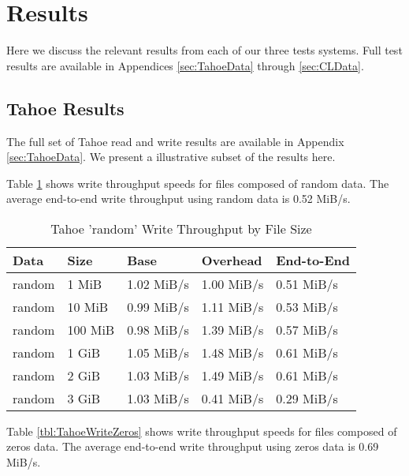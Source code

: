 \documentclass[11pt]{article}
\begin{document}
\section{Results}

Here we discuss the relevant results from each of our three tests
systems. Full test results are available in Appendices
\ref{sec:TahoeData} through \ref{sec:CLData}.

\subsection{Tahoe Results}

The full set of Tahoe read and write results are available in Appendix
\ref{sec:TahoeData}. We present a illustrative subset of the results
here.

Table \ref{tbl:TahoeWriteRandom} shows write throughput speeds for files
composed of random data. The average end-to-end write throughput using
random data is 0.52 MiB/s.

\begin{table}
  \begin{center}
    \begin{tabularx}{\textwidth}{|X|X|X|X|X|}
      \hline
      {\bf Data} & {\bf Size} & {\bf Base} & {\bf Overhead} & {\bf End-to-End} \\ \hline
      random & 1 MiB & 1.02 MiB/s & 1.00 MiB/s & 0.51 MiB/s \\ \hline
      random & 10 MiB & 0.99 MiB/s & 1.11 MiB/s & 0.53 MiB/s \\ \hline
      random & 100 MiB & 0.98 MiB/s & 1.39 MiB/s & 0.57 MiB/s \\ \hline
      random & 1 GiB & 1.05 MiB/s & 1.48 MiB/s & 0.61 MiB/s \\ \hline
      random & 2 GiB & 1.03 MiB/s & 1.49 MiB/s & 0.61 MiB/s \\ \hline
      random & 3 GiB & 1.03 MiB/s & 0.41 MiB/s & 0.29 MiB/s \\ \hline
    \end{tabularx}
    \caption{Tahoe 'random' Write Throughput by File Size}
    \label{tbl:TahoeWriteRandom}
  \end{center}
\end{table}

Table \ref{tbl:TahoeWriteZeros} shows write throughput speeds for files
composed of zeros data. The average end-to-end write throughput using
zeros data is 0.69 MiB/s.
\end{document}
